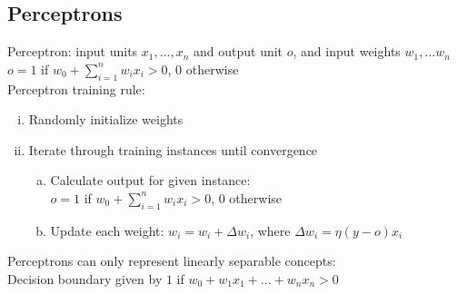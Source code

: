 \documentclass{article}
\begin{document}
		\subsection{Perceptrons}
			Perceptron: input units $x_1, ..., x_n$ and output unit $o$, and input weights $w_1, ... w_n$ \\
			$o = 1$ if $w_0 + \sum_{i = 1}^n w_ix_i > 0$, 0 otherwise \\
			Perceptron training rule:
			\begin{enumerate}[(i)]
				\item Randomly initialize weights
				\item Iterate through training instances until convergence
				\begin{enumerate}[(a)]
					\item Calculate output for given instance: \\
					$o = 1$ if $w_0 + \sum_{i = 1}^n w_ix_i > 0$, 0 otherwise 
					\item Update each weight: $w_i = w_i + \Delta w_i$, where $\Delta w_i = \eta(y - o)x_i$
					\end{enumerate}
				\end{enumerate}
			Perceptrons can only represent linearly separable concepts: \\
			Decision boundary given by $1$ if $w_0 + w_1x_1 + ... + w_nx_n > 0$
\end{document}
